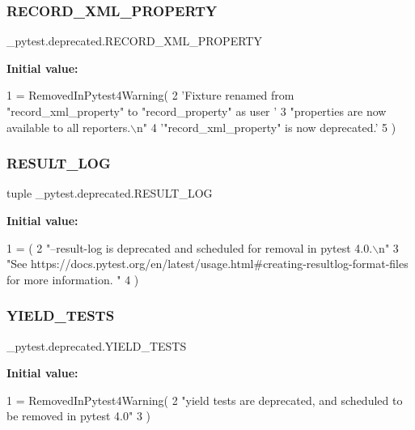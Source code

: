 \subsubsection{\texorpdfstring{R\+E\+C\+O\+R\+D\+\_\+\+X\+M\+L\+\_\+\+P\+R\+O\+P\+E\+R\+TY}{RECORD\_XML\_PROPERTY}}
{\footnotesize\ttfamily \+\_\+pytest.\+deprecated.\+R\+E\+C\+O\+R\+D\+\_\+\+X\+M\+L\+\_\+\+P\+R\+O\+P\+E\+R\+TY}

{\bfseries Initial value\+:}
\begin{DoxyCode}
1 =  RemovedInPytest4Warning(
2     \textcolor{stringliteral}{'Fixture renamed from "record\_xml\_property" to "record\_property" as user '}
3     \textcolor{stringliteral}{"properties are now available to all reporters.\(\backslash\)n"}
4     \textcolor{stringliteral}{'"record\_xml\_property" is now deprecated.'}
5 )
\end{DoxyCode}
\mbox{\label{namespace__pytest_1_1deprecated_a1ebeda7be9e688bacce1204c27b1b8c9}} 
\subsubsection{\texorpdfstring{R\+E\+S\+U\+L\+T\+\_\+\+L\+OG}{RESULT\_LOG}}
{\footnotesize\ttfamily tuple \+\_\+pytest.\+deprecated.\+R\+E\+S\+U\+L\+T\+\_\+\+L\+OG}

{\bfseries Initial value\+:}
\begin{DoxyCode}
1 =  (
2     \textcolor{stringliteral}{"--result-log is deprecated and scheduled for removal in pytest 4.0.\(\backslash\)n"}
3     \textcolor{stringliteral}{"See https://docs.pytest.org/en/latest/usage.html#creating-resultlog-format-files for more information.
      "}
4 )
\end{DoxyCode}
\mbox{\label{namespace__pytest_1_1deprecated_a27a652d816afaa125922a0dccbd5636c}} 
\subsubsection{\texorpdfstring{Y\+I\+E\+L\+D\+\_\+\+T\+E\+S\+TS}{YIELD\_TESTS}}
{\footnotesize\ttfamily \+\_\+pytest.\+deprecated.\+Y\+I\+E\+L\+D\+\_\+\+T\+E\+S\+TS}

{\bfseries Initial value\+:}
\begin{DoxyCode}
1 =  RemovedInPytest4Warning(
2     \textcolor{stringliteral}{"yield tests are deprecated, and scheduled to be removed in pytest 4.0"}
3 )
\end{DoxyCode}
